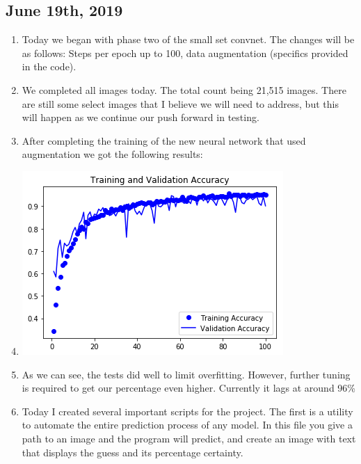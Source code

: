 \documentclass[12pt]{article} %
\begin{document}
\subsection{June 19th, 2019}
\noindent\makebox[\linewidth]{\rule{15cm}{0.4pt}}
\begin{enumerate}[label = (\roman*)]
\item Today we began with phase two of the small set convnet. The changes will be as follows:\newline
 Steps per epoch up to 100, data augmentation (specifics provided in the code).
\item We completed all images today. The total count being 21,515 images. There are still some select images that I believe we will need to address, but this will happen as we continue our push forward in testing.
\item After completing the training of the new neural network that used augmentation we got the following results:
\item \includegraphics{convnet-test-2-val-acc}
\item As we can see, the tests did well to limit overfitting. However, further tuning is required to get our percentage even higher. Currently it lags at around 96\%
\item Today I created several important scripts for the project. The first is a utility to automate the entire prediction process of any model. In this file you give a path to an image and the program will predict, and create an image with text that displays the guess and its percentage certainty.

\end{enumerate}
\end{document}
